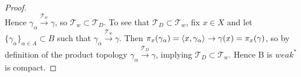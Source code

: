 \begin{thm}
\begin{proof}
\begin{equation}
        \end{equation}
        Hence $\gamma_\alpha \overset{\mathcal{T}_w}{\to} \gamma$, so $\mathcal{T}_w \subset \mathcal{T}_D$.  
        To see that $\mathcal{T}_D \subset \mathcal{T}_w$, fix $x\in X$ and let $\{\gamma_\alpha\}_{\alpha \in A} \subset B$ such that $\gamma_\alpha \overset{\mathcal{T}_w}{\to} \gamma$. 
        Then $\pi_x(\gamma_\alpha) = \left\langle x,\gamma_\alpha \right\rangle \to \gamma(x) = \pi_x(\gamma)$, so by definition of the product topology $\gamma_\alpha \overset{\mathcal{T}_D}{\to} \gamma$, implying $\mathcal{T}_D \subset \mathcal{T}_w$.  Hence B is $weak^{*}$ is compact. 
    \end{proof}
\end{thm} 



